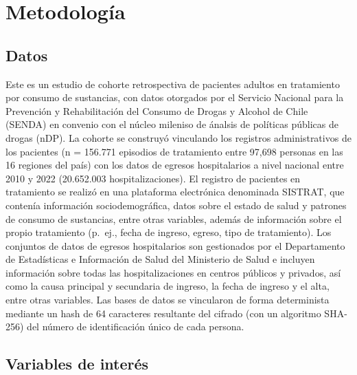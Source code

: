 \documentclass[
  spanish,
  10pt,
]{article}
\begin{document}
\section{Metodología}\label{metodologuxeda}

\subsection{Datos}\label{datos}

Este es un estudio de cohorte retrospectiva de pacientes adultos en
tratamiento por consumo de sustancias, con datos otorgados por el
Servicio Nacional para la Prevención y Rehabilitación del Consumo de
Drogas y Alcohol de Chile (SENDA) en convenio con el núcleo mileniso de
ánalsis de políticas públicas de drogas (nDP). La cohorte se construyó
vinculando los registros administrativos de los pacientes (n = 156.771
episodios de tratamiento entre 97,698 personas en las 16 regiones del
país) con los datos de egresos hospitalarios a nivel nacional entre 2010
y 2022 (20.652.003 hospitalizaciones). El registro de pacientes en
tratamiento se realizó en una plataforma electrónica denominada SISTRAT,
que contenía información sociodemográfica, datos sobre el estado de
salud y patrones de consumo de sustancias, entre otras variables, además
de información sobre el propio tratamiento (p.~ej., fecha de ingreso,
egreso, tipo de tratamiento). Los conjuntos de datos de egresos
hospitalarios son gestionados por el Departamento de Estadísticas e
Información de Salud del Ministerio de Salud e incluyen información
sobre todas las hospitalizaciones en centros públicos y privados, así
como la causa principal y secundaria de ingreso, la fecha de ingreso y
el alta, entre otras variables. Las bases de datos se vincularon de
forma determinista mediante un hash de 64 caracteres resultante del
cifrado (con un algoritmo SHA-256) del número de identificación único de
cada persona.

\subsection{Variables de interés}\label{variables-de-interuxe9s}
\end{document}

